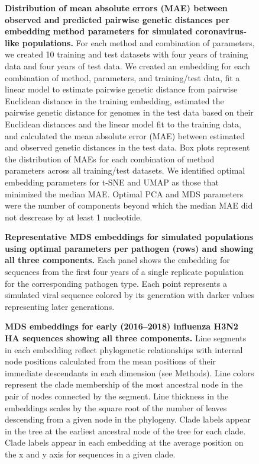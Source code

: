\documentclass[webpdf,contemporary,large,single]{oup-authoring-template}%
\theoremstyle{thmstyleone}%
\theoremstyle{thmstyletwo}%
\theoremstyle{thmstylethree}%
\begin{document}
\begin{figure}[H]
\caption{{\bf Distribution of mean absolute errors (MAE) between observed and predicted pairwise genetic distances per embedding method parameters for simulated coronavirus-like populations.}
  For each method and combination of parameters, we created 10 training and test datasets with four years of training data and four years of test data.
  We created an embedding for each combination of method, parameters, and training/test data, fit a linear model to estimate pairwise genetic distance from pairwise Euclidean distance in the training embedding, estimated the pairwise genetic distance for genomes in the test data based on their Euclidean distances and the linear model fit to the training data, and calculated the mean absolute error (MAE) between estimated and observed genetic distances in the test data.
  Box plots represent the distribution of MAEs for each combination of method parameters across all training/test datasets.
  We identified optimal embedding parameters for t-SNE and UMAP as those that minimized the median MAE.
  Optimal PCA and MDS parameters were the number of components beyond which the median MAE did not descrease by at least 1 nucleotide.
}\label{S_Fig_simulated_coronavirus_errors}
\end{figure}

\begin{figure}[H]
\caption{{\bf Representative MDS embeddings for simulated populations using optimal parameters per pathogen (rows) and showing all three components.}
  Each panel shows the embedding for sequences from the first four years of a single replicate population for the corresponding pathogen type.
  Each point represents a simulated viral sequence colored by its generation with darker values representing later generations.}\label{S_Fig_simulated_representative_mds_embeddings}
\end{figure}

\begin{figure}[H]
\caption{{\bf MDS embeddings for early (2016--2018) influenza H3N2 HA sequences showing all three components.}
Line segments in each embedding reflect phylogenetic relationships with internal node positions calculated from the mean positions of their immediate descendants in each dimension (see Methods).
Line colors represent the clade membership of the most ancestral node in the pair of nodes connected by the segment.
Line thickness in the embeddings scales by the square root of the number of leaves descending from a given node in the phylogeny.
Clade labels appear in the tree at the earliest ancestral node of the tree for each clade.
Clade labels appear in each embedding at the average position on the x and y axis for sequences in a given clade.}\label{S_Fig_early_flu_mds_embeddings}
\end{figure}
\end{document}
